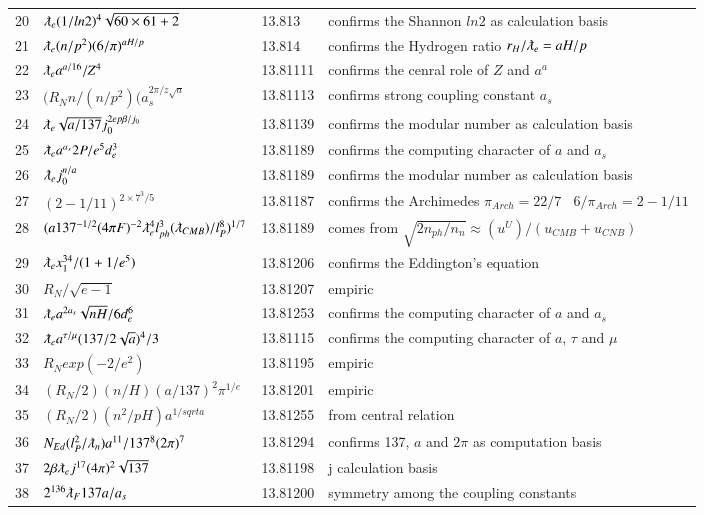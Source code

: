 \documentclass[a4paper,9pt]{article}
\begin{document}
\begin{appendix}
\begin{table}
\begin{tabular}{llll}
    20 & $\lambdabar_{e} (1/ln2)^4\sqrt{60 \times 61+2} $ & 13.813 & confirms the Shannon $ln2$ as calculation basis\\
    21 & $\lambdabar_{e} (n/p^2) (6/\pi)^{aH/p}$ & 13.814 & confirms the Hydrogen ratio $r_H/\lambdabar_e = aH/p$\\
   22 & $\lambdabar_{e} a^{a/16} /Z^4$ & 13.81111 & confirms the cenral role of $Z$ and $a^a$\\
   23 & $(R_N n/ (n/p^2) (a_s^{2\pi/z\sqrt a}$ & 13.81113 & confirms strong coupling constant $a_s$\\
  24 & $ \lambdabar_{e} \sqrt{a/137} j_0^{2ep\beta/j_0}$ & 13.81139 & confirms the modular number as calculation basis\\ 
   25 & $\lambdabar_{e} a^{a_s} 2P/e^5d_e^3$ & 13.81189 & confirms the computing character of $a$ and $a_s$ \\
   26 & $\lambdabar_{e} j_0^{n/a}$ & 13.81189 & confirms the modular number as calculation basis\\
   27 & $(2-1/11)^{2\times 7^3/5}$ & 13.81187 & confirms the Archimedes $\pi_{Arch} = 22/7~~~~ 6/\pi_{Arch} =2-1/11$\\
   28 & $(a 137^{-1/2}(4\pi F)^{-2} \lambdabar_{e}^4 l_{ph}^3 (\lambdabar_{CMB})/l_P^8)^{1/7}$ & 13.81189 & comes from $\sqrt{2n_{ph}/n_n} \approx (u^U)/(u_{CMB}+u_{CNB})$\\
   29 & $\lambdabar_{e} x_1^{34} /(1+1/e^5)$ & 13.81206 & confirms the Eddington's equation\\
   30 & $R_N /\sqrt {e-1}$ & 13.81207 & empiric\\
    31 & $\lambdabar_{e} a^{2a_s} \sqrt{nH}/6d_e^6 $ & 13.81253 & confirms the computing character of $a$ and $a_s$\\
    32 & $\lambdabar_{e} a^{\tau / \mu} (137/2\sqrt a)^4 /3 $ & 13.81115 & confirms the computing character of $a$, $\tau$ and $\mu$\\
   33 & $R_N exp(-2/e^2)$ & 13.81195 & empiric\\
   34 & $(R_N/2)(n/H)(a/137)^2 \pi^{1/e}$ & 13.81201 & empiric\\ 
   35 & $(R_N/2)(n^2/pH)a^{1/sqrt a}$ & 13.81255 & from central relation\\  
   36 & $N_{Ed}(l_P^2/ \lambdabar_n) a^{11}/137^8 (2\pi)^7   $ & 13.81294 & confirms 137, $a$ and $2\pi$ as computation basis\\
  37 & $2\beta \lambdabar_{e} j^{17} (4\pi)^2 \sqrt{137}$ & 13.81198 & j calculation basis \\
  38 & $ 2^{136}\lambdabar_{F}137 a/a_s $ & 13.81200 & symmetry among the coupling constants \\

\end{tabular}
\end{table}
\end{appendix}
\end{document}
